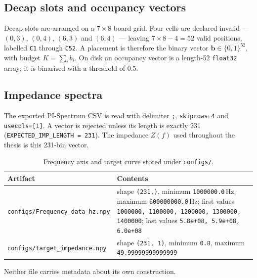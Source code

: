 \subsection{Decap slots and occupancy vectors}
\label{subsec:appA_occupancy}

Decap slots are arranged on a $7\times8$ board grid. Four cells are declared invalid ---
$(0,3)$, $(0,4)$, $(6,3)$ and $(6,4)$ --- leaving $7\times8-4 = 52$ valid positions, labelled
\texttt{C1} through \texttt{C52}. A placement is therefore the binary vector
$\mathbf{b}\in\{0,1\}^{52}$, with budget $K = \sum_i b_i$. On disk an occupancy vector is a
length-52 \texttt{float32} array; it is binarised with a threshold of $0.5$.


\subsection{Impedance spectra}
\label{subsec:appA_impedance}

The exported PI-Spectrum CSV is read with delimiter \texttt{;}, \texttt{skiprows=4} and
\texttt{usecols=[1]}. A vector is rejected unless its length is exactly 231
(\texttt{EXPECTED\_IMP\_LENGTH = 231}). The impedance $Z(f)$ used throughout the thesis is this
231-bin vector.

\begin{table}[htbp]
\centering
\caption{Frequency axis and target curve stored under \texttt{configs/}.}
\label{tab:appA_freq_axis}
\begin{tabular}{p{} p{}}
\hline
Artifact & Contents \\
\hline
\texttt{configs/Frequency\_data\_hz.npy} &
shape \texttt{(231,)}, minimum \texttt{1000000.0}\,Hz, maximum \texttt{600000000.0}\,Hz;
first values \texttt{1000000, 1100000, 1200000, 1300000, 1400000}; last values
\texttt{5.8e+08, 5.9e+08, 6.0e+08} \\
\texttt{configs/target\_impedance.npy} &
shape \texttt{(231, 1)}, minimum \texttt{0.8}, maximum \texttt{49.99999999999999} \\
\hline
\end{tabular}
\end{table}

Neither file carries metadata about its own construction.

